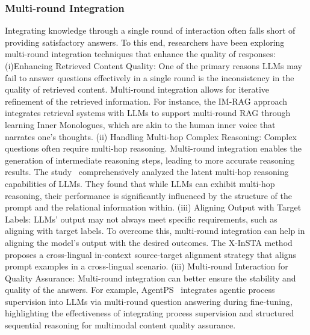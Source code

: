 \documentclass[lettersize,journal]{IEEEtran}
\begin{document}
\subsubsection{Multi-round Integration}
Integrating knowledge through a single round of interaction often falls short of providing satisfactory answers. To this end, researchers have been exploring multi-round integration techniques that enhance the quality of responses: (i)Enhancing Retrieved Content Quality: 
One of the primary reasons LLMs may fail to answer questions effectively in a single round is the inconsistency in the quality of retrieved content.
Multi-round integration allows for iterative refinement of the retrieved information. For instance, the IM-RAG approach~\cite{yang2024rag,tanwar2023multilingual} integrates retrieval systems with LLMs to support multi-round RAG through learning Inner Monologues, which are akin to the human inner voice that narrates one's thoughts.
(ii) Handling Multi-hop Complex Reasoning: Complex questions often require multi-hop reasoning. Multi-round integration enables the generation of intermediate reasoning steps, leading to more accurate reasoning results. The study~\cite{yang2024large} comprehensively analyzed the latent multi-hop reasoning capabilities of LLMs. 
They found that while LLMs can exhibit multi-hop reasoning, their performance is significantly influenced by the structure of the prompt and the relational information within.
(iii) Aligning Output with Target Labels: LLMs' output may not always meet specific requirements, such as aligning with target labels. To overcome this, multi-round integration can help in aligning the model's output with the desired outcomes. The X-InSTA method~\cite{tanwar2023multilingual} proposes a cross-lingual in-context source-target alignment strategy that aligns prompt examples in a cross-lingual scenario.
(iii) Multi-round Interaction for Quality Assurance: Multi-round integration can better ensure the stability and quality of the answers.
For example, AgentPS~\cite{liu2024agentps} integrates agentic process supervision into LLMs via multi-round question answering during fine-tuning, highlighting the effectiveness of integrating process supervision and structured sequential reasoning for multimodal content quality assurance.



\end{document}

